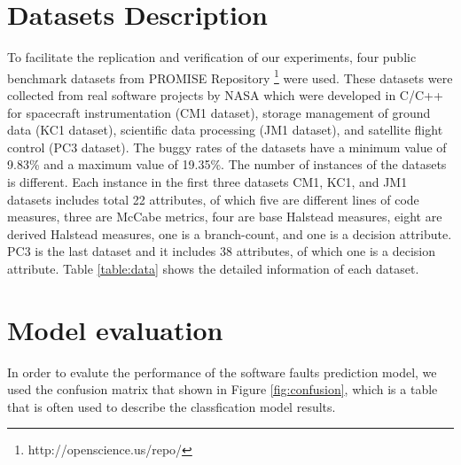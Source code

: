 \documentclass[runningheads,a4paper]{llncs}
\begin{document}
\begin{table}[H]
\caption{Datasets Description}
\begin{centering}
\par\end{centering}
\label{table:data}
\end{table}

\section{Datasets Description}
\label{data}
To facilitate the replication and verification of our experiments, four public benchmark datasets \cite{data6464273} from PROMISE Repository \footnote{http://openscience.us/repo/} were used. These datasets were collected from real software projects by NASA which were developed in C/C++ for spacecraft instrumentation (CM1 dataset), storage management of ground data (KC1 dataset), scientific data processing (JM1 dataset), and satellite flight control (PC3 dataset). The buggy rates of the datasets have a minimum value of 9.83\% and a maximum value of 19.35\%. The number of instances of the datasets is different. Each instance in the first three datasets CM1, KC1, and JM1 datasets includes total 22 attributes, of which five are different lines of code measures, three are McCabe metrics, four are base Halstead measures, eight are derived Halstead measures, one is a branch-count, and one is a decision attribute. PC3 is the last dataset and it includes 38 attributes, of which one is a decision attribute. Table \ref{table:data} shows the detailed information of each dataset.



\section{Model evaluation}
\label{evaluation_criteria}
In order to evalute the performance of the software faults prediction model, we used the confusion matrix that shown in Figure \ref{fig:confusion}, which is a table that is often used to describe the classfication model results. 
\end{document}
